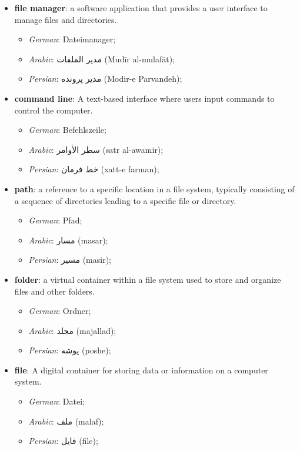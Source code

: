 \documentclass[
]{book}
\providecommand{\tightlist}{%
  \setlength{\itemsep}{0pt}\setlength{\parskip}{0pt}}
\begin{document}
\begin{itemize}
\tightlist
\item
  \textbf{file manager}: a software application that provides a user interface to manage files and directories.

  \begin{itemize}
  \tightlist
  \item
    \emph{German}: Dateimanager;
  \item
    \emph{Arabic}: مدير الملفات (Mudīr al-mulafāt);
  \item
    \emph{Persian}: مدیر پرونده (Modir-e Parvandeh);
  \end{itemize}
\item
  \textbf{command line}: A text-based interface where users input commands to control the computer.

  \begin{itemize}
  \tightlist
  \item
    \emph{German}: Befehlszeile;
  \item
    \emph{Arabic}: سطر الأوامر (satr al-awamir);
  \item
    \emph{Persian}: خط فرمان (xatt-e farman);
  \end{itemize}
\item
  \textbf{path}: a reference to a specific location in a file system, typically consisting of a sequence of directories leading to a specific file or directory.

  \begin{itemize}
  \tightlist
  \item
    \emph{German}: Pfad;
  \item
    \emph{Arabic}: مسار (masar);
  \item
    \emph{Persian}: مسیر (masir);
  \end{itemize}
\item
  \textbf{folder}: a virtual container within a file system used to store and organize files and other folders.

  \begin{itemize}
  \tightlist
  \item
    \emph{German}: Ordner;
  \item
    \emph{Arabic}: مجلد (majallad);
  \item
    \emph{Persian}: پوشه (poshe);
  \end{itemize}
\item
  \textbf{file}: A digital container for storing data or information on a computer system.

  \begin{itemize}
  \tightlist
  \item
    \emph{German}: Datei;
  \item
    \emph{Arabic}: ملف (malaf);
  \item
    \emph{Persian}: فایل (file);
  \end{itemize}
\end{itemize}
\end{document}
